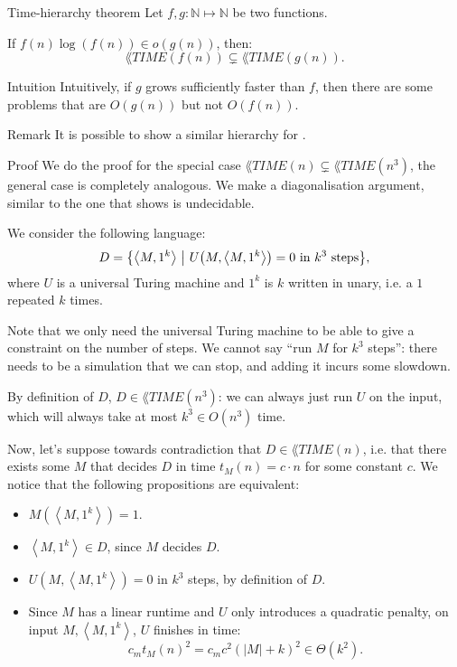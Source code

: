 \documentclass[a4paper]{article}
\begin{document}
\begin{parag}{Time-hierarchy theorem}
    Let $f, g: \mathbb{N} \mapsto \mathbb{N}$ be two functions.

    If $f\left(n\right) \log\left(f\left(n\right)\right) \in o\left(g\left(n\right)\right)$, then:
    \[\lang{TIME}\left(f\left(n\right)\right) \subsetneq \lang{TIME}\left(g\left(n\right)\right).\]

    \begin{subparag}{Intuition}
        Intuitively, if $g$ grows sufficiently faster than $f$, then there are some problems that are $O\left(g\left(n\right)\right)$ but not $O\left(f\left(n\right)\right)$.
    \end{subparag}

    \begin{subparag}{Remark}
        It is possible to show a similar hierarchy for .
    \end{subparag}

    \begin{subparag}{Proof}
        We do the proof for the special case $\lang{TIME}\left(n\right) \subsetneq \lang{TIME}\left(n^3\right)$, the general case is completely analogous. We make a diagonalisation argument, similar to the one that shows  is undecidable.

        We consider the following language: 
        \[D = \left\{\left\langle M, 1^k \right\rangle \suchthat U\left(M, \left\langle M, 1^k \right\rangle\right) = 0 \text{ in $k^3$ steps}\right\},\]
        where $U$ is a universal Turing machine and $1^k$ is $k$ written in unary, i.e. a $1$ repeated $k$ times.

        Note that we only need the universal Turing machine to be able to give a constraint on the number of steps. We cannot say ``run $M$ for $k^3$ steps'': there needs to be a simulation that we can stop, and adding it incurs some slowdown.

        By definition of $D$, $D \in \lang{TIME}\left(n^3\right)$: we can always just run $U$ on the input, which will always take at most $k^3 \in O\left(n^3\right)$ time.

        Now, let's suppose towards contradiction that $D \in \lang{TIME}\left(n\right)$, i.e. that there exists some $M$ that decides $D$ in time $t_M\left(n\right) = c\cdot n$ for some constant $c$. We notice that the following propositions are equivalent:
        \begin{itemize}
            \item $M\left(\left\langle M, 1^k \right\rangle\right) = 1$.
            \item $\left\langle M, 1^k \right\rangle \in D$, since $M$ decides $D$.
            \item $U\left(M, \left\langle M, 1^k \right\rangle\right) = 0$ in $k^3$ steps, by definition of $D$.
            \item Since $M$ has a linear runtime and $U$ only introduces a quadratic penalty, on input $M, \left\langle M, 1^k \right\rangle$, $U$ finishes in time: 
            \[c_m t_M\left(n\right)^2 = c_m c^2 \left(\left|M\right| + k\right)^2 \in \Theta\left(k^2\right).\]
            

\end{itemize}
\end{subparag}
\end{parag}
\end{document}
